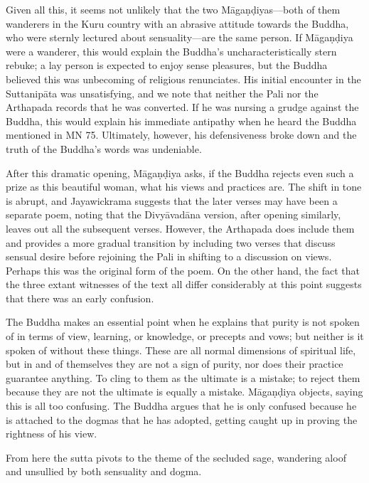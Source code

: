\documentclass[12pt,openany]{book}%
\begin{document}
Given all this, it seems not unlikely that the two \textsanskrit{Māgaṇḍiyas}—both of them wanderers in the Kuru country with an abrasive attitude towards the Buddha, who were sternly lectured about sensuality—are the same person. If \textsanskrit{Māgaṇḍiya} were a wanderer, this would explain the Buddha’s uncharacteristically stern rebuke; a lay person is expected to enjoy sense pleasures, but the Buddha believed this was unbecoming of religious renunciates. His initial encounter in the \textsanskrit{Suttanipāta} was unsatisfying, and we note that neither the Pali nor the Arthapada records that he was converted. If he was nursing a grudge against the Buddha, this would explain his immediate antipathy when he heard the Buddha mentioned in MN 75. Ultimately, however, his defensiveness broke down and the truth of the Buddha’s words was undeniable.

After this dramatic opening, \textsanskrit{Māgaṇḍiya} asks, if the Buddha rejects even such a prize as this beautiful woman, what his views and practices are. The shift in tone is abrupt, and Jayawickrama suggests that the later verses may have been a separate poem, noting that the \textsanskrit{Divyāvadāna} version, after opening similarly, leaves out all the subsequent verses. However, the Arthapada does include them and provides a more gradual transition by including two verses that discuss sensual desire before rejoining the Pali in shifting to a discussion on views. Perhaps this was the original form of the poem. On the other hand, the fact that the three extant witnesses of the text all differ considerably at this point suggests that there was an early confusion.

The Buddha makes an essential point when he explains that purity is not spoken of in terms of view, learning, or knowledge, or precepts and vows; but neither is it spoken of without these things. These are all normal dimensions of spiritual life, but in and of themselves they are not a sign of purity, nor does their practice guarantee anything. To cling to them as the ultimate is a mistake; to reject them because they are not the ultimate is equally a mistake. \textsanskrit{Māgaṇḍiya} objects, saying this is all too confusing. The Buddha argues that he is only confused because he is attached to the dogmas that he has adopted, getting caught up in proving the rightness of his view.

From here the sutta pivots to the theme of the secluded sage, wandering aloof and unsullied by both sensuality and dogma.
\end{document}
